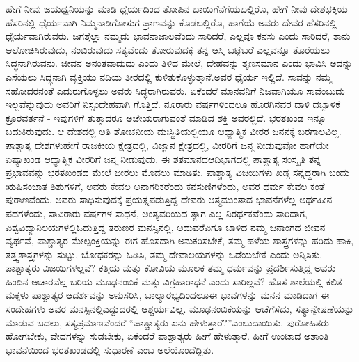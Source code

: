 ಹೇಗೆ ನೀವು ಜಯಧ್ವನಿಯನ್ನು ಮಾಡಿ ಧೈರ್ಯದಿಂದ ತೋಪಿನ ಬಾಯಿಗೆ\break ನೆಗೆಯಬಲ್ಲಿರೊ, ಹೇಗೆ ನೀವು ದೇಶಭಕ್ತಿಯ ಹೆಸರಿನಲ್ಲಿ ಧೈರ್ಯವಾಗಿ ನಿಮ್ಮ\break ನಾಡಿಗೋಸುಗ ಪ್ರಾಣವನ್ನು ಕೊಡಬಲ್ಲಿರೊ, ಹಾಗೆಯೆ ಅವರು ದೇವರ ಹೆಸರಿನಲ್ಲಿ ಧೈರ್ಯವಾಗಿರುವರು. ಜಗತ್ತೆಲ್ಲಾ ನಮ್ಮದು ಭಾವನಾಜಾಲವೆಂದು ಸಾರಿದರೆ, ಎಲ್ಲವೂ ಕನಸು ಎಂದು ಸಾರಿದರೆ, ತಾನು ಆಲೋಚಿಸಿರುವುದು, ನಂಬಿರುವುದು ಸತ್ಯವೆಂದು ತೋರುವುದಕ್ಕೆ ತನ್ನ ಆಸ್ತಿ ಬಟ್ಟೆಬರೆ ಎಲ್ಲವನ್ನೂ ತೊರೆಯಲು ಸಿದ್ಧನಾಗಿರುವನು. ಜೀವನ ಅನಂತವಾದುದು ಎಂದು ತಿಳಿದ ಮೇಲೆ, ದೇಹವನ್ನು ತೃಣಸಮಾನ ಎಂದು ಭಾವಿಸಿ ಅದನ್ನು ಎಸೆಯಲು ಸಿದ್ಧನಾಗಿ ವ್ಯಕ್ತಿಯು ನದಿಯ ತೀರದಲ್ಲಿ ಕುಳಿತುಕೊಳ್ಳುತ್ತಾನೆ.\break ಅವರ ಧೈರ್ಯ ಇಲ್ಲಿದೆ. ಸಾವನ್ನು ನಮ್ಮ ಸಹೋದರನಂತೆ ಎದುರುಗೊಳ್ಳಲು ಅವರು ಸಿದ್ಧರಾಗಿರುವರು. ಏಕೆಂದರೆ ಮಾನವನಿಗೆ ನಿಜವಾಗಿಯೂ ಸಾವೆಂಬುದು ಇಲ್ಲವೆನ್ನುವುದು ಅವರಿಗೆ ನಿಸ್ಸಂದೇಹವಾಗಿ ಗೊತ್ತಿದೆ. ನೂರಾರು ವರ್ಷಗಳಿಂದಲೂ ಹೊರಗಿನವರ ದಾಳಿ ದಬ್ಬಾಳಿಕೆ ಕ್ರೂರವರ್ತನೆ - ಇವುಗಳಿಗೆ ತುತ್ತಾದರೂ ಅಜೇಯರಾಗುವಂತೆ ಮಾಡಿದ ಶಕ್ತಿ ಅವರಲ್ಲಿದೆ. ಭರತಖಂಡ ಇನ್ನೂ ಬದುಕಿರುವುದು. ಆ ದೇಶದಲ್ಲಿ ಅತಿ ಶೋಚನೀಯ ದುಃಸ್ಥಿತಿಯಲ್ಲಿಯೂ ಆಧ್ಯಾತ್ಮಿಕ ವೀರರ ಜನನಕ್ಕೆ ಬರಗಾಲವಿಲ್ಲ. ಪಾಶ್ಚಾತ್ಯ ದೇಶಗಳು\break ಹೇಗೆ ರಾಜಕೀಯ ಕ್ಷೇತ್ರದಲ್ಲಿ, ವಿಜ್ಞಾನ ಕ್ಷೇತ್ರದಲ್ಲಿ, ವೀರರಿಗೆ ಜನ್ಮ ನೀಡುವುವೋ ಹಾಗೆಯೇ ಏಷ್ಯಾಖಂಡ ಆಧ್ಯಾತ್ಮಿಕ ವೀರರಿಗೆ ಜನ್ಮ ನೀಡುವುದು. ಈ ಶತಮಾನದ\break ಆದಿಭಾಗದಲ್ಲಿ ಪಾಶ್ಚಾತ್ಯ ಸಂಸ್ಕೃತಿ ತನ್ನ ಪ್ರಭಾವವನ್ನು ಭರತಖಂಡದ ಮೇಲೆ ಬೀರಲು ಮೊದಲು ಮಾಡಿತು. ಪಾಶ್ಚಾತ್ಯ ವಿಜಯಿಗಳು ಖಡ್ಗ ಸನ್ನದ್ಧರಾಗಿ ಬಂದು ಋಷಿಸಂಜಾತ ಶಿಶುಗಳಿಗೆ, ಅವರು ಕೇವಲ ಅನಾಗರಿಕರೆಂದು ಕನಸುಣಿಗಳೆಂದು, ಅವರ ಧರ್ಮ ಕೇವಲ ಕಂತೆ ಪುರಾಣವೆಂದು, ಅವರು ಸಾಧಿಸುವುದಕ್ಕೆ ಪ್ರಯತ್ನಪಡುತ್ತಿದ್ದ ದೇವರು ಆತ್ಮ\break ಮುಂತಾದ ಭಾವನೆಗಳೆಲ್ಲ ಅರ್ಥಹೀನ ಪದಗಳೆಂದು, ಸಾವಿರಾರು ವರ್ಷಗಳ ಸಾಧನೆ, ಅಂತ್ಯವರಿಯದ ತ್ಯಾಗ ಎಲ್ಲ ನಿರರ್ಥಕವೆಂದು ಸಾರಿದಾಗ, ವಿಶ್ವವಿದ್ಯಾನಿಲಯಗಳಲ್ಲಿ\break ಓದುತ್ತಿದ್ದ ತರುಣರ ಮನಸ್ಸಿನಲ್ಲಿ, ಅದುವರೆವಿಗೂ ಬಾಳಿದ ನಮ್ಮ ಜನಾಂಗದ ಜೀವನ ವ್ಯರ್ಥವೆ, ಪಾಶ್ಚಾತ್ಯರ ಮೇಲ್ಪಂಕ್ತಿಯನ್ನು ಈಗ ಹೊಸದಾಗಿ ಅನುಕರಿಸಬೇಕೆ, ತಮ್ಮ ಹಳೆಯ ಶಾಸ್ತ್ರಗಳನ್ನು ಹರಿದು ಹಾಕಿ, ತತ್ತ್ವಶಾಸ್ತ್ರಗಳನ್ನು ಸುಟ್ಟು, ಬೋಧಕರನ್ನು ಓಡಿಸಿ, ತಮ್ಮ ದೇವಾಲಯಗಳನ್ನು ಒಡೆಯಬೇಕೆ ಎಂದು ಅನ್ನಿಸಿತು. ಪಾಶ್ಚಾತ್ಯರು ವಿಜಯಿಗಳಲ್ಲವೆ? ಕತ್ತಿಯ ಮತ್ತು ಕೋವಿಯ ಮೂಲಕ ತಮ್ಮ ಧರ್ಮವನ್ನು ಪ್ರದರ್ಶಿಸುತ್ತಿದ್ದ ಅವರು ಹಿಂದಿನ ಆಚಾರವೆಲ್ಲ ಬರಿಯ ಮೂಢನಂಬಿಕೆ ಮತ್ತು ವಿಗ್ರಹಾರಾಧನೆ ಎಂದು ಸಾರಿಲ್ಲವೆ? ಹೊಸ ಶಾಲೆಯಲ್ಲಿ ಕಲಿತ ಮಕ್ಕಳು ಪಾಶ್ಚಾತ್ಯರ ಆದರ್ಶವನ್ನು ಅನುಸರಿಸಿ, ಬಾಲ್ಯಾರಭ್ಯದಿಂದಲೂ\break ಈ ಭಾವಗಳನ್ನು ಮನನ ಮಾಡಿದಾಗ ಈ ಸಂದೇಹಗಳು ಅವರ ಮನಸ್ಸಿನಲ್ಲಿ\break ಎದ್ದುದರಲ್ಲಿ ಆಶ್ಚರ್ಯವಿಲ್ಲ. ಮೂಢನಂಬಿಕೆಯನ್ನು ಆಚೆಗೆಸೆದು, ಸತ್ಯಾನ್ವೇಷಣೆಯನ್ನು ಮಾಡುವ ಬದಲು, ಸತ್ಯಪ್ರಮಾಣವೆಂದರೆ “ಪಾಶ್ಚಾತ್ಯರು ಏನು ಹೇಳುತ್ತಾರೆ?”\break ಎಂಬುದಾಯಿತು. ಪುರೋಹಿತರು ಹೋಗಬೇಕು, ವೇದಗಳನ್ನು ಸುಡಬೇಕು, ಏಕೆಂದರೆ ಪಾಶ್ಚಾತ್ಯರು ಹೀಗೆ ಹೇಳುತ್ತಾರೆ. ಹೀಗೆ ಉಂಟಾದ ಅಶಾಂತಿ ಭಾವನೆಯಿಂದ ಭರತ\-ಖಂಡದಲ್ಲಿ ಸುಧಾರಣೆ ಎಂಬ ಅಲೆಯೊಂದೆದ್ದಿತು.

